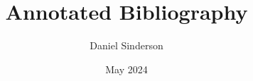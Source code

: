 \documentclass{article}
\title{Annotated Bibliography}
\author{Daniel Sinderson}
\date{May 2024}
\theoremstyle{definition}
\begin{document}
\maketitle
\nocite{*}


\end{document}
